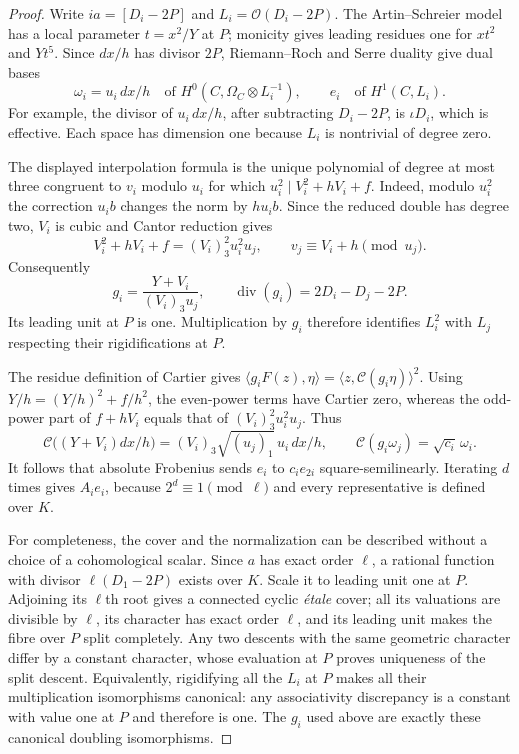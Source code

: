 \documentclass[11pt,a4paper]{article}
\begin{document}
\begin{proof}
Write $ia=[D_i-2P]$ and $L_i=\mathcal O(D_i-2P)$.
The Artin--Schreier model has a local parameter $t=x^2/Y$ at $P$;
monicity gives leading residues one for $xt^2$ and $Yt^5$.
Since $dx/h$ has divisor $2P$, Riemann--Roch and Serre duality
give dual bases
\[
 \omega_i=u_i\,dx/h\quad\text{of }H^0(C,\Omega_C\otimes L_i^{-1}),
 \qquad e_i\quad\text{of }H^1(C,L_i).
\]
For example, the divisor of $u_i\,dx/h$, after subtracting
$D_i-2P$, is $\iota D_i$, which is effective. Each space has
dimension one because $L_i$ is nontrivial of degree zero.

The displayed interpolation formula is the unique polynomial of
degree at most three congruent to $v_i$ modulo $u_i$ for which
$u_i^2\mid V_i^2+hV_i+f$. Indeed, modulo $u_i^2$ the correction
$u_i b$ changes the norm by $hu_i b$. Since the reduced double
has degree two, $V_i$ is cubic and Cantor reduction gives
\[
 V_i^2+hV_i+f=(V_i)_3^2u_i^2u_j,
 \qquad v_j\equiv V_i+h\pmod {u_j}.
\]
Consequently
\[
 g_i=\frac{Y+V_i}{(V_i)_3u_j},\qquad
 \operatorname{div}(g_i)=2D_i-D_j-2P.
\]
Its leading unit at $P$ is one. Multiplication by $g_i$ therefore
identifies $L_i^2$ with $L_j$ respecting their rigidifications at $P$.

The residue definition of Cartier gives
$\langle g_iF(z),\eta\rangle
 =\langle z,\mathcal C(g_i\eta)\rangle^2$.
Using $Y/h=(Y/h)^2+f/h^2$, the even-power terms have Cartier zero,
whereas the odd-power part of $f+hV_i$ equals that of
$(V_i)_3^2u_i^2u_j$. Thus
\[
 \mathcal C\bigl((Y+V_i)dx/h\bigr)
      =(V_i)_3\sqrt{(u_j)_1}\,u_i\,dx/h,
 \qquad
 \mathcal C(g_i\omega_j)=\sqrt{c_i}\,\omega_i.
\]
It follows that absolute Frobenius sends $e_i$ to $c_i e_{2i}$
square-semilinearly. Iterating $d$ times gives $A_i e_i$, because
$2^d\equiv1\pmod\ell$ and every representative is defined over $K$.

For completeness, the cover and the normalization can be described
without a choice of a cohomological scalar. Since $a$ has exact
order $\ell$, a rational function with divisor $\ell(D_1-2P)$
exists over $K$. Scale it to leading unit one at $P$. Adjoining
its $\ell$th root gives a connected cyclic \emph{\'etale} cover;
all its valuations are divisible by $\ell$, its character has
exact order $\ell$, and its leading unit makes the fibre over
$P$ split completely. Any two descents with the same geometric
character differ by a constant character, whose evaluation at
$P$ proves uniqueness of the split descent. Equivalently,
rigidifying all the $L_i$ at $P$ makes all their multiplication
isomorphisms canonical: any associativity discrepancy is a
constant with value one at $P$ and therefore is one. The $g_i$
used above are exactly these canonical doubling isomorphisms.


\end{proof}
\end{document}
